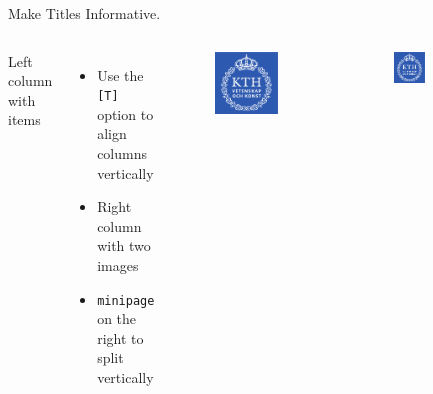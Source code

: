 \documentclass{beamer}
\begin{document}
\begin{frame}{Make Titles Informative.}
  \begin{columns}[T]
      Left column with items
      \begin{itemize}
      \item
        Use the \texttt{[T]} option to align columns vertically
      \item
        Right column with two images
      \item
        \texttt{minipage} on the right to split vertically
      \end{itemize}
      \begin{minipage}[c][0.35\textheight][c]{0.9\textwidth}
        \begin{figure}
          \includegraphics[width=0.8\textwidth]{kth-beamer-resources/logo.pdf}
        \end{figure}
      \end{minipage}
      \begin{minipage}[c][0.35\textheight][c]{0.9\textwidth}
        \begin{figure}
          \includegraphics[width=0.4\textwidth]{kth-beamer-resources/logo.pdf}%

\end{figure}
\end{minipage}
\end{columns}
\end{frame}
\end{document}
